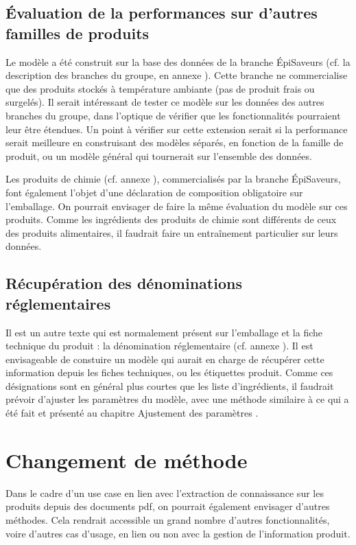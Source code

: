     \subsection{\'{E}valuation de la performances sur d'autres familles de produits}
    Le modèle a été construit sur la base des données de la branche \'{E}piSaveurs (cf. la description des branches du groupe, en annexe ).
    Cette branche ne commercialise que des produits stockés à température ambiante (pas de produit frais ou surgelés).
    Il serait intéressant de tester ce modèle sur les données des autres branches du groupe, dans l'optique de vérifier que les fonctionnalités pourraient leur être étendues.
    Un point à vérifier sur cette extension serait si la performance serait meilleure en construisant des modèles séparés, en fonction de la famille de produit, ou un modèle général qui tournerait sur l'ensemble des données.

    Les produits de chimie (cf. annexe ), commercialisés par la branche \'{E}piSaveurs, font également l'objet d'une déclaration de composition obligatoire sur l'emballage.
    On pourrait envisager de faire la même évaluation du modèle sur ces produits.
    Comme les \og ingrédients \fg des produits de chimie sont différents de ceux des produits alimentaires, il faudrait faire un entraînement particulier sur leurs données.

    \subsection{Récupération des dénominations réglementaires}

    Il est un autre texte qui est normalement présent sur l'emballage et la fiche technique du produit : la dénomination réglementaire (cf. annexe ).
    Il est envisageable de constuire un modèle qui aurait en charge de récupérer cette information depuis les fiches techniques, ou les étiquettes produit.
    Comme ces désignations sont en général plus courtes que les liste d'ingrédients, il faudrait prévoir d'ajuster les paramètres du modèle, avec une méthode similaire à ce qui a été fait et présenté au chapitre  \og Ajustement des paramètres \fg.

    \section{Changement de méthode}

    Dans le cadre d'un use case en lien avec l'extraction de connaissance sur les produits depuis des documents pdf, on pourrait également envisager d'autres méthodes.
    Cela rendrait accessible un grand nombre d'autres fonctionnalités, voire d'autres cas d'usage, en lien ou non avec la gestion de l'information produit.

